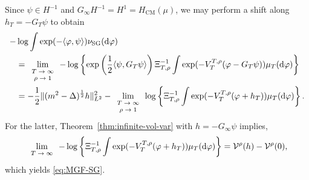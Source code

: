 \documentclass[11pt, a4paper]{scrartcl}
\numberwithin{equation}{section}
\theoremstyle{plain}
\theoremstyle{remark}
\newcommand{\mathd}{\mathrm{d}}
\newcommand{\tmop}[1]{\ensuremath{\operatorname{#1}}}
\newcommand{\tmscript}[1]{\text{\scriptsize{$#1$}}}
\begin{document}
Since $\psi\in H^{-1}$ and $G_\infty H^{-1}=H^{1}=H_{\tmop{CM}} (\mu)$,
we may perform a shift along $h_T = - G_T \psi$ to obtain
\begin{equation*}
  \begin{aligned}
    - & \log \int \exp (- \langle \varphi, \psi \rangle) \nu_{\tmop{SG}} (\mathd
   \varphi) \\ 
    & = \lim_{\tmscript{\begin{array}{c}
      T \rightarrow \infty\\
      \rho \rightarrow 1
    \end{array}}} - \log \left\{ \exp \left( \frac{1}{2} \langle \psi, G_T \psi \rangle \right) \Xi_{T, \rho}^{- 1} \int \exp (- V_T^{T, \rho}
    (\varphi - G_T \psi)) \mu_T (\mathd \varphi) \right\}\\
    & = - \frac{1}{2} \| (m^2-\Delta)^{\frac{1}{2}}h\|_{L^2}^2 
    - \lim_{\tmscript{\begin{array}{c}
      T \rightarrow \infty\\
      \rho \rightarrow 1
    \end{array}}}  \log \left\{
      \Xi_{T, \rho}^{- 1} \int \exp (- V_T^{T, \rho} (\varphi + h_T))
      \mu_T (\mathd \varphi) \right\}.
  \end{aligned}
\end{equation*}
For the latter, Theorem~\ref{thm:infinite-vol-var} with $h=-G_\infty\psi$ implies,
\[ \lim_{\tmscript{\begin{array}{c}
     T \rightarrow \infty
   \end{array}}} - \log \left\{ \Xi_{T, \rho}^{- 1} \int \exp (- V_T^{T, \rho}
   (\varphi + h_T)) \mu_T (\mathd \varphi) \right\} =
   \mathcal{V}^{\rho} (h) - \mathcal{V}^{\rho} (0), \]
which yields \eqref{eq:MGF-SG}.
\end{document}
